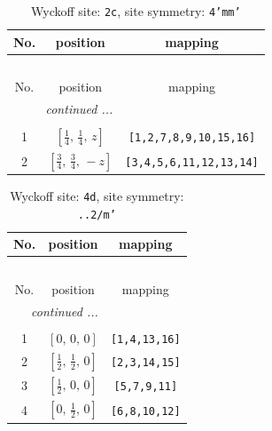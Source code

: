 \documentclass[fleqn,8pt]{jsarticle}
\begin{document}
\renewcommand{\arraystretch}{1.2}
\begin{longtable}{ccc}
\caption{Wyckoff site: {\tt 2c}, site symmetry: {\tt 4'mm'}}
 \\
 \hline \hline
No. & position & mapping \\ \hline \endfirsthead

\multicolumn{2}{l}{\tablename\ \thetable{}} \\
 \hline \hline
No. & position & mapping \\ \hline \endhead

 \hline \hline
\multicolumn{2}{r}{\footnotesize\it continued ...} \\ \endfoot

 \hline \hline
\multicolumn{2}{r}{} \\ \endlastfoot

1 & $\left[ \frac{1}{4},\, \frac{1}{4},\, z \right]$ & {\tt [1,2,7,8,9,10,15,16]} \\ \hline
2 & $\left[ \frac{3}{4},\, \frac{3}{4},\, - z \right]$ & {\tt [3,4,5,6,11,12,13,14]} \\
\end{longtable}
\renewcommand{\arraystretch}{1.2}
\begin{longtable}{ccc}
\caption{Wyckoff site: {\tt 4d}, site symmetry: {\tt ..2/m'}}
 \\
 \hline \hline
No. & position & mapping \\ \hline \endfirsthead

\multicolumn{2}{l}{\tablename\ \thetable{}} \\
 \hline \hline
No. & position & mapping \\ \hline \endhead

 \hline \hline
\multicolumn{2}{r}{\footnotesize\it continued ...} \\ \endfoot

 \hline \hline
\multicolumn{2}{r}{} \\ \endlastfoot

1 & $\left[ 0,\, 0,\, 0 \right]$ & {\tt [1,4,13,16]} \\ \hline
2 & $\left[ \frac{1}{2},\, \frac{1}{2},\, 0 \right]$ & {\tt [2,3,14,15]} \\ \hline
3 & $\left[ \frac{1}{2},\, 0,\, 0 \right]$ & {\tt [5,7,9,11]} \\ \hline
4 & $\left[ 0,\, \frac{1}{2},\, 0 \right]$ & {\tt [6,8,10,12]} \\
\end{longtable}
\renewcommand{\arraystretch}{1.2}
\end{document}
